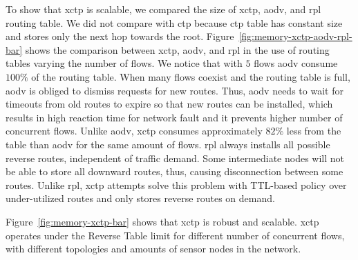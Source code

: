 To show that \ac{xctp} is scalable, we compared the size of \ac{xctp}, \ac{aodv}, and \ac{rpl} routing table. We did not compare with \ac{ctp} because \ac{ctp} table has constant size and stores only the next hop towards the root. Figure~\ref{fig:memory-xctp-aodv-rpl-bar} shows the comparison between \ac{xctp}, \ac{aodv}, and \ac{rpl} in the use of routing tables varying the number of flows. We notice that with $5$ flows \ac{aodv} consume $100\%$ of the routing table. When many flows coexist and the routing table is full, \ac{aodv} is obliged to dismiss requests for new routes. Thus, \ac{aodv} needs to wait for timeouts from old routes to expire so that new routes can be installed, which results in high reaction time for network fault and it prevents higher number of concurrent flows. Unlike \ac{aodv}, \ac{xctp} consumes approximately $82\% $ less from the table than \ac{aodv} for the same amount of flows. \ac{rpl} always installs all possible reverse routes, independent of traffic demand. Some intermediate nodes will not be able to store all downward routes, thus, causing disconnection between some routes. Unlike \ac{rpl}, \ac{xctp} attempts solve this problem with TTL-based policy over under-utilized routes and only stores reverse routes on demand.

Figure~\ref{fig:memory-xctp-bar} shows that \ac{xctp} is robust and scalable. \ac{xctp} operates under the Reverse Table limit for different number of concurrent flows, with different topologies and amounts of sensor nodes in the network.





